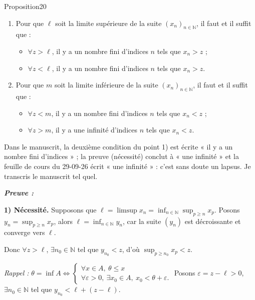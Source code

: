 \documentclass[11pt,a4paper]{article}
\newcommand{\N}{\mathbb{N}}
\newenvironment{preuve}{\par\textit{\textbf{Preuve :}}\par\nopagebreak[4]}{\par}
\begin{document}
\begin{enonce}{Proposition}{20}
\begin{enumerate}[label=\textbf{\arabic*)},leftmargin=1.2cm]
  \item Pour que $\ell$ soit la limite supérieure de la suite $(x_n)_{n\in\N}$, il faut et il suffit que :
  \begin{itemize}[leftmargin=0.8cm]
    \item $\forall z>\ell$, il y a un nombre fini d'indices $n$ tels que $x_n>z$ ;
    \item $\forall z<\ell$, il y a un nombre fini d'indices $n$ tels que $x_n>z$.
  \end{itemize}
  \item Pour que $m$ soit la limite inférieure de la suite $(x_n)_{n\in\N}$, il faut et il suffit que :
  \begin{itemize}[leftmargin=0.8cm]
    \item $\forall z<m$, il y a un nombre fini d'indices $n$ tels que $x_n<z$ ;
    \item $\forall z>m$, il y a une infinité d'indices $n$ tels que $x_n<z$.
  \end{itemize}
\end{enumerate}
\end{enonce}

\begin{note}
Dans le manuscrit, la deuxième condition du point 1) est écrite « il y a un nombre fini d'indices » ; la preuve (nécessité) conclut
à « une infinité » et la feuille de cours du 29-09-26 écrit « une infinité » : c'est sans doute un lapsus. Je transcris le manuscrit tel quel.
\end{note}

\begin{preuve}\end{preuve}
\textbf{1) Nécessité.} Supposons que $\ell=\limsup x_n=\inf_{n\in\N}\sup_{p\ge n}x_p$. Posons $y_n=\sup_{p\ge n}x_p$, alors
$\ell=\inf_{n\in\N}y_n$, car la suite $(y_n)$ est décroissante et converge vers $\ell$.

Donc $\forall z>\ell$, $\exists n_0\in\N$ tel que $y_{n_0}<z$, d'où $\sup_{p\ge n_0}x_p<z$.

\emph{Rappel :} $\theta=\inf A\iff\begin{cases}\forall x\in A,\ \theta\le x\\ \forall\varepsilon>0,\ \exists x_0\in A,\ x_0<\theta+\varepsilon.\end{cases}$
Posons $\varepsilon=z-\ell>0$, $\exists n_0\in\N$ tel que $y_{n_0}<\ell+(z-\ell)$.
\end{document}
